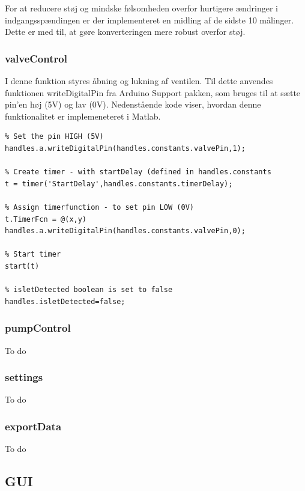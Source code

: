 For at reducere støj og mindske følsomheden overfor hurtigere ændringer i indgangsspændingen er der implementeret en midling af de sidste 10 målinger. Dette er med til, at gøre konverteringen mere robust overfor støj.  


\subsubsection{valveControl}
I denne funktion styres åbning og lukning af ventilen. Til dette anvendes funktionen writeDigitalPin fra Arduino Support pakken, som bruges til at sætte pin'en høj (5V) og lav (0V). Nedenstående kode viser, hvordan denne funktionalitet er implemeneteret i Matlab.   
\begin{lstlisting} 
% Set the pin HIGH (5V)
handles.a.writeDigitalPin(handles.constants.valvePin,1);

% Create timer - with startDelay (defined in handles.constants
t = timer('StartDelay',handles.constants.timerDelay);

% Assign timerfunction - to set pin LOW (0V)
t.TimerFcn = @(x,y) handles.a.writeDigitalPin(handles.constants.valvePin,0);

% Start timer
start(t)

% isletDetected boolean is set to false
handles.isletDetected=false;
\end{lstlisting} 

\subsubsection{pumpControl}
To do
\subsubsection{settings}
To do
\subsubsection{exportData}
To do
\newpage
\subsection{GUI}
